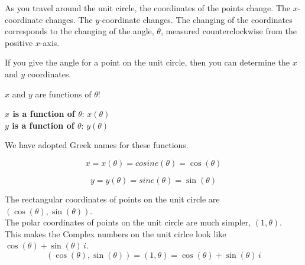 \documentclass{ximera}
\begin{document}
\qquad


As you travel around the unit circle, the coordinates of the points change. The $x$-coordinate changes.  The $y$-coordinate changes. The changing of the coordinates corresponds to the changing of the angle, $\theta$, measured counterclockwise from the positive $x$-axis.   

If you give the angle for a point on the unit circle, then you can determine the $x$ and $y$ coordinates.

$x$ and $y$ are functions of $\theta$! \\


\begin{center}

\textbf{\textcolor{blue!55!black}{$x$ is a function of $\theta$}}: $x(\theta)$ \\

\textbf{\textcolor{blue!55!black}{$y$ is a function of $\theta$}}: $y(\theta)$ \\

\end{center}




We have adopted Greek names for these functions.



\[
x = x(\theta) = cosine(\theta) = \cos(\theta)
\]




\[
y = y(\theta) = sine(\theta) = \sin(\theta)
\]



The rectangular coordinates of points on the unit circle are $(\cos(\theta), \sin(\theta))$. \\

The polar coordinates of points on the unit circle are much simpler, $(1, \theta)$. \\

This makes the Complex numbers on the unit cirlce look like $\cos(\theta) + \sin(\theta) \, i$. \\




\[
(\cos(\theta), \sin(\theta)) = (1, \theta) = \cos(\theta) + \sin(\theta) \, i
\]
\end{document}
